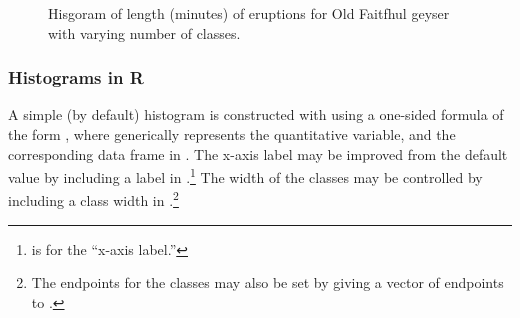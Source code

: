 \documentclass[10pt,openany]{book}\usepackage[]{graphicx}\usepackage[]{color}
\newenvironment{knitrout}{}{} %
\begin{document}
\begin{knitrout}
\color{fgcolor}


















































\begin{figure}[hbtp]

{\centering {}

}

\caption[Hisgoram of length (minutes) of eruptions for Old Faitfhul geyser with varying number of classes]{Hisgoram of length (minutes) of eruptions for Old Faitfhul geyser with varying number of classes.}\label{fig:histOF}
\end{figure}


\end{knitrout}

\subsubsection{Histograms in R}
A simple (by default) histogram is constructed with  using a one-sided formula of the form , where  generically represents the quantitative variable, and the corresponding data frame in .  The x-axis label may be improved from the default value by including a label in .\footnote{ is for the ``x-axis label.''}  The width of the classes may be controlled by including a class width in .\footnote{The endpoints for the classes may also be set by giving a vector of endpoints to .}
\end{document}
